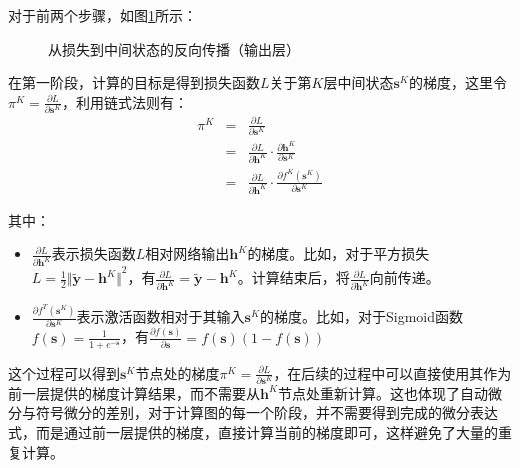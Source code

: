 \parinterval  对于前两个步骤，如图\ref{fig:5-54}所示：

\begin{figure}[htp]
\centering

\caption{从损失到中间状态的反向传播（输出层）}
\label{fig:5-54}
\end{figure}

\parinterval  在第一阶段，计算的目标是得到损失函数$ L $关于第$ K $层中间状态$ \mathbf s^K $的梯度，这里令$ {\pi}^K= \frac{\partial L}{\partial \mathbf s^K} $，利用链式法则有：
\begin{eqnarray}
{\pi}^K&=& \frac{\partial L}{\partial \mathbf s^K}\nonumber\\
&=&\frac{\partial L}{\partial \mathbf h^K}\cdot \frac{\partial \mathbf h^K}{\partial \mathbf s^K}\nonumber\\
&=&\frac{\partial L}{\partial \mathbf h^K}\cdot \frac{\partial f^K(\mathbf s^K)}{\partial \mathbf s^K}
\label{eq:5-49}
\end{eqnarray}

\noindent  其中：

\begin{spacing}{1.6}
\begin{itemize}
\vspace{0.5em}
\item $ \frac{\partial L}{\partial \mathbf h^K} $表示损失函数$ L $相对网络输出$ \mathbf h^K $的梯度。比如，对于平方损失$ L=\frac{1}{2}{\Vert \widetilde {\mathbf y}-\mathbf h^K\Vert}^2 $，有$ \frac{\partial L}{\partial \mathbf h^K}= \widetilde{ \mathbf y} -\mathbf h^K $。计算结束后，将$ \frac{\partial L}{\partial \mathbf h^K} $向前传递。
\vspace{0.5em}
\item $ \frac{\partial f^T(\mathbf s^K)}{\partial \mathbf s^K} $表示激活函数相对于其输入$ \mathbf s^K $的梯度。比如，对于Sigmoid函数$ f(\mathbf s)=\frac{1}{1+e^{- \mathbf s}}$，有$ \frac{\partial f(\mathbf s)}{\partial \mathbf s}=f(\mathbf s) (1-f(\mathbf s))$
\vspace{0.5em}
\end{itemize}
\end{spacing}

\parinterval  这个过程可以得到$ \mathbf s^K $节点处的梯度$ {\pi}^K= \frac{\partial L}{\partial \mathbf s^K} $，在后续的过程中可以直接使用其作为前一层提供的梯度计算结果，而不需要从$ \mathbf h^K $节点处重新计算。这也体现了自动微分与符号微分的差别，对于计算图的每一个阶段，并不需要得到完成的微分表达式，而是通过前一层提供的梯度，直接计算当前的梯度即可，这样避免了大量的重复计算。


